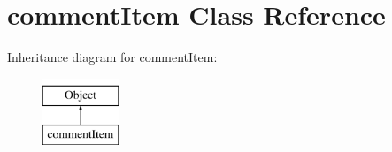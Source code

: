 \hypertarget{classcommentItem}{\section{comment\-Item Class Reference}
\label{classcommentItem}
}
Inheritance diagram for comment\-Item\-:\begin{figure}[H]
\begin{center}
\leavevmode
\includegraphics[height=2.000000cm]{classcommentItem}
\end{center}
\end{figure}
